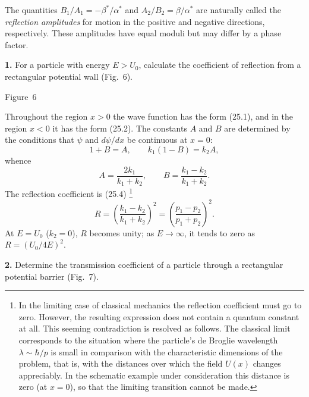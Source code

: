 The quantities $B_1/A_1=-\beta^*/\alpha^*$ and
$A_2/B_2=\beta/\alpha^*$ are naturally called the \emph{reflection
amplitudes} for motion in the positive and negative directions,
respectively. These amplitudes have equal moduli but may differ by a phase
factor.

\ProblemHeading
\textbf{1.} For a particle with energy $E>U_0$, calculate the coefficient of
reflection from a rectangular potential wall (Fig.~6).

\begin{center}

\small Figure~6
\end{center}

\SolutionHeading
Throughout the region $x>0$ the wave function has the form (25.1), and in
the region $x<0$ it has the form (25.2). The constants $A$ and $B$ are
determined by the conditions that $\psi$ and $d\psi/dx$ be continuous at
$x=0$:
\[
  1+B=A,\qquad k_1(1-B)=k_2A,
\]
whence
\[
  A=\frac{2k_1}{k_1+k_2},
  \qquad B=\frac{k_1-k_2}{k_1+k_2}.
\]
The reflection coefficient is (25.4)
\footnote{In the limiting case of classical mechanics the reflection
coefficient must go to zero. However, the resulting expression does not
contain a quantum constant at all. This seeming contradiction is resolved
as follows. The classical limit corresponds to the situation where the particle's de Broglie wavelength
$\lambda\sim\hbar/p$ is small in comparison with the characteristic
dimensions of the problem, that is, with the distances over which the field
$U(x)$ changes appreciably. In the schematic example under consideration
this distance is zero (at $x=0$), so that the limiting transition cannot be
made.}
\[
  R=\left(\frac{k_1-k_2}{k_1+k_2}\right)^2
  =\left(\frac{p_1-p_2}{p_1+p_2}\right)^2.
\]
At $E=U_0$ ($k_2=0$), $R$ becomes unity; as $E\to\infty$, it tends to zero
as $R=(U_0/4E)^2$.

\ProblemHeading
\textbf{2.} Determine the transmission coefficient of a particle through a
rectangular potential barrier (Fig.~7).

